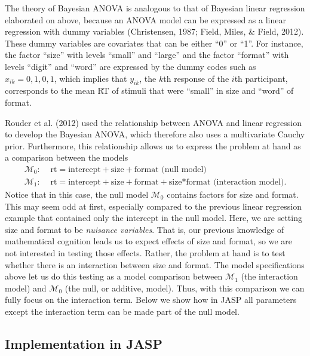 \documentclass[english,,doc,floatsintext]{apa6}
\begin{document}
The theory of Bayesian ANOVA is analogous to that of Bayesian linear regression elaborated on above, because an ANOVA model can be expressed as a linear regression with dummy variables (Christensen, 1987; Field, Miles, \& Field, 2012). These dummy variables are covariates that can be either \enquote{0} or \enquote{1}. For instance, the factor \enquote{size} with levels \enquote{small} and \enquote{large} and the factor \enquote{format} with levels \enquote{digit} and \enquote{word} are expressed by the dummy codes such as \(x_{ik} = 0, 1, 0, 1\), which implies that \(y_{ik}\), the \(k\)th response of the \(i\)th participant, corresponds to the mean RT of stimuli that were \enquote{small} in size and \enquote{word} of format.

Rouder et al. (2012) used the relationship between ANOVA and linear regression to develop the Bayesian ANOVA, which therefore also uses a multivariate Cauchy prior. Furthermore, this relationship allows us to express the problem at hand as a comparison between the models
\begin{align*}
  \mathcal{M}_{0}: & \text{ rt} = \text{intercept} + \text{size}+\text{format} \text{ (null model)}\\
  \mathcal{M}_{1}: & \text{ rt} = \text{intercept} + \text{size}+\text{format}+\text{size*format} \text{ (interaction model)}. 
\end{align*}
Notice that in this case, the null model \(\mathcal{M}_0\) contains factors for size and format. This may seem odd at first, especially compared to the previous linear regression example that contained only the intercept in the null model. Here, we are setting size and format to be \emph{nuisance variables}. That is, our previous knowledge of mathematical cognition leads us to expect effects of size and format, so we are not interested in testing those effects. Rather, the problem at hand is to test whether there is an interaction between size and format. The model specifications above let us do this testing as a model comparison between \(\mathcal{M}_1\) (the interaction model) and \(\mathcal{M}_0\) (the null, or additive, model). Thus, with this comparison we can fully focus on the interaction term. Below we show how in JASP all parameters except the interaction term can be made part of the null model.

\hypertarget{implementation-in-jasp}{%
\subsection{Implementation in JASP}\label{implementation-in-jasp}}
\end{document}
